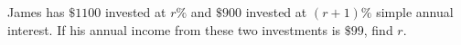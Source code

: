 James has $\$1100$ invested at $r\%$ and $\$900$ invested at $(r+1)\%$ simple annual interest. If his annual income from these two investments is $\$99$, find $r$.

